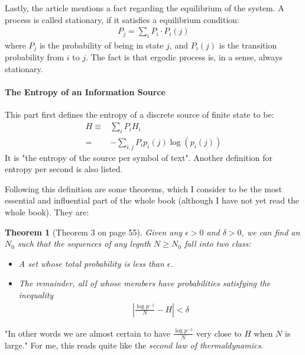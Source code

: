 \documentclass{article}
\numberwithin{equation}{subsection} %
\newtheorem{thm}{Theorem}[section]
\theoremstyle{definition}
\begin{document}
    Lastly, the article mentions a fact regarding the equilibrium of
    the system. A process is called stationary, if it satisfies a
    equilibrium condition:
    \begin{align}
        \label{eq:Ergodic_and_Mixed_States:equil_condition}
        P_j = \sum_i P_i \cdot P_i(j)
    \end{align}
    where $P_j$ is the probability of being in state $j$, and $P_i(j)$ is
    the transition probability from $i$ to $j$.
    The fact is that ergodic process is, in a sense, always stationary.

    \paragraph{The Entropy of an Information Source}
    This part first defines the entropy of a discrete source of finite state
    to be:
    \begin{align}
        \label{eq:entropy_of_discrete_infor_source}
        H \equiv& \sum_i P_i H_i\\
        =& -\sum_{i,j} P_i p_i(j) \log(p_i(j)) \nonumber
    \end{align}
    It is "the entropy of the source per symbol of text". Another
    definition for entropy per second is also listed.

    Following this definition are some theorems, which I consider to be
    the most essential and influential part of the whole book (although
    I have not yet read the whole book). They are:

    \begin{thm}[Theorem 3 on page 55]
        Given any $\epsilon >0$ and $\delta >0$, we can find an $N_0$
        such that the sequences of any legnth $N\geq N_0$ fall into
        two class:
        \begin{itemize}
            \item A set whose total probability is less than $\epsilon$.
            \item The remainder, all of whose members have probabilities
                satisfying the inequality
                \begin{align}
                    \label{eq:Entropy_of_info_source:thm3}
                    \left| \frac{\log p^{-1}}{N}-H\right| < \delta
                \end{align}
        \end{itemize}
    \end{thm}
    "In other words we are almost certain to have 
    $\frac{\log p^{-1}}{N}$ very close to $H$ when $N$ is large."
    For me, this reads quite like the \textit{second law of
    thermaldynamics}.
\end{document}
